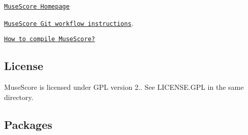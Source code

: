 \begin{DoxyItemize}
\item \href{https://musescore.org}{\tt Muse\+Score Homepage}
\item \href{https://musescore.org/en/developers-handbook/git-workflow}{\tt Muse\+Score Git workflow instructions}.
\item \href{https://musescore.org/en/developers-handbook/compilation}{\tt How to compile Muse\+Score?}
\end{DoxyItemize}

\subsection*{License}

Muse\+Score is licensed under G\+PL version 2.. See L\+I\+C\+E\+N\+S\+E.\+G\+PL in the same directory.

\subsection*{Packages}


